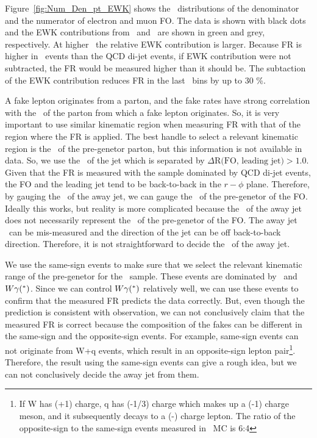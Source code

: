 Figure~\ref{fig:Num_Den_pt_EWK} shows the \pt\ distributions of the denominator and the 
numerator of electron and muon FO. The data is shown with black dots and 
the EWK contributions from \dyll\ and \Wjets\ are shown in green 
and grey, respectively. At higher \pt\ the relative EWK contribution 
is larger. Because FR is higher in \Wjets\ events than the QCD di-jet 
events, if EWK contribution were not subtracted, the FR would be 
measured higher than it should be. The subtaction of the EWK contribution 
reduces FR in the last \pt\ bins by up to 30 \%.

A fake lepton originates from a parton, and the fake rates have strong 
correlation with the \pt\ of the parton from which a fake lepton originates.
So, it is very important to use similar kinematic region when measuring FR 
with that of the region where the FR is applied. The best handle to select 
a relevant kinematic region is the 
\pt\ of the pre-genetor parton, but this information is not available in data.   
So, we use the \pt\ of the jet which is separated by $\Delta \textrm{R(FO, leading jet)} > 1.0$.  
Given that the FR is measured with the sample dominated by QCD di-jet events, 
the FO and the leading jet tend to be back-to-back in the $r-\phi$ plane.
Therefore, by gauging the \pt\ of the away jet, we can gauge the \pt\ 
of the pre-genetor of the FO. Ideally this works, but reality is more 
complicated because the \pt\ of the away jet does not necessarily represent 
the \pt\ of the pre-genetor of the FO. The away jet \pt\ can be mis-measured 
and the direction of the jet can be off back-to-back direction.  
Therefore, it is not straightforward to decide the \pt\ of the away jet. 

We use the same-sign events to make sure that we select the 
relevant kinematic range of the pre-genetor for the \Wjets\ sample. 
These events are dominated by \Wjets\ and $W\gamma(^*)$. 
Since we can control $W\gamma(^*)$
relatively well, we can use these events to confirm that the measured 
FR predicts the data correctly. 
But, even though the prediction is consistent with observation, 
we can not conclusively claim that the measured FR is correct 
because the composition of the fakes can be different in the same-sign 
and the opposite-sign events. 
For example, same-sign events can not originate from W+q events, 
which result in an opposite-sign lepton pair\footnote{If W has (+1) charge, 
q has (-1/3) charge which makes up a (-1) charge meson, and it subsequently decays 
to a (-) charge lepton. The ratio of the opposite-sign to the same-sign events 
measured in \Wjets\ MC is 6:4}. Therefore, the result using the same-sign events can 
give a rough idea, but we can not conclusively decide the away jet \pt from them. 

